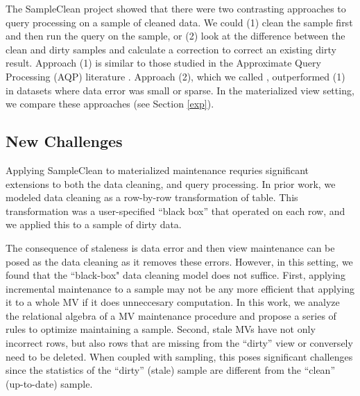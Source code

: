 The SampleClean project showed that there were two contrasting approaches to query processing on a sample of cleaned data.
We could (1) clean the sample first and then run the query on the sample, or (2) look at the difference between the clean and dirty samples and calculate a correction to correct an existing dirty result. 
Approach (1) is similar to those studied in the Approximate Query Processing (AQP) literature \cite{OlkenR86,AgarwalMPMMS13, joshi2008materialized}.
Approach (2), which we called \nsc, outperformed (1) in datasets where data error was small or sparse.
In the materialized view setting, we compare these approaches (see Section \ref{exp}). 


\subsection{New Challenges}
Applying SampleClean to materialized maintenance requries significant extensions to both the data cleaning, and query processing.
In prior work, we modeled data cleaning as a row-by-row transformation of table.
This transformation was a user-specified  ``black box'' that operated on each row, and we applied this to a sample of dirty data.

The consequence of staleness is data error and then view maintenance can be posed as the data cleaning as it removes these errors.
However, in this setting, we found that the ``black-box" data cleaning model does not suffice.
First, applying incremental maintenance to a sample may not be any more efficient that applying it to a whole MV if it does unneccesary computation.
In this work, we analyze the relational algebra of a MV maintenance procedure and propose a series of rules to optimize maintaining a sample.
Second, stale MVs have not only incorrect rows, but also rows that are missing from the ``dirty'' view or conversely need to be deleted.
When coupled with sampling, this poses significant challenges since the statistics of the ``dirty'' (stale) sample are different from the ``clean'' (up-to-date) sample.

